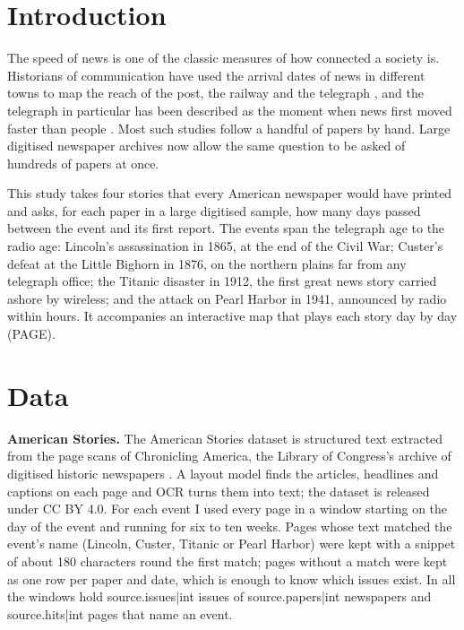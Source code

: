 \documentclass[11pt,a4paper]{article}
\begin{document}
\section{Introduction}
The speed of news is one of the classic measures of how connected a society is. Historians of communication have used the arrival dates of news in different towns to map the reach of the post, the railway and the telegraph \citep{pred1973}, and the telegraph in particular has been described as the moment when news first moved faster than people \citep{standage1998,blondheim1994}. Most such studies follow a handful of papers by hand. Large digitised newspaper archives now allow the same question to be asked of hundreds of papers at once.

This study takes four stories that every American newspaper would have printed and asks, for each paper in a large digitised sample, how many days passed between the event and its first report. The events span the telegraph age to the radio age: Lincoln's assassination in 1865, at the end of the Civil War; Custer's defeat at the Little Bighorn in 1876, on the northern plains far from any telegraph office; the Titanic disaster in 1912, the first great news story carried ashore by wireless; and the attack on Pearl Harbor in 1941, announced by radio within hours. It accompanies an interactive map that plays each story day by day ({{PAGE}}).

\section{Data}
\textbf{American Stories.} The American Stories dataset \citep{dell2023} is structured text extracted from the page scans of Chronicling America, the Library of Congress's archive of digitised historic newspapers \citep{chronam}. A layout model finds the articles, headlines and captions on each page and OCR turns them into text; the dataset is released under CC BY 4.0. For each event I used every page in a window starting on the day of the event and running for six to ten weeks. Pages whose text matched the event's name (Lincoln, Custer, Titanic or Pearl Harbor) were kept with a snippet of about 180 characters round the first match; pages without a match were kept as one row per paper and date, which is enough to know which issues exist. In all the windows hold {{source.issues|int}} issues of {{source.papers|int}} newspapers and {{source.hits|int}} pages that name an event.
\end{document}
